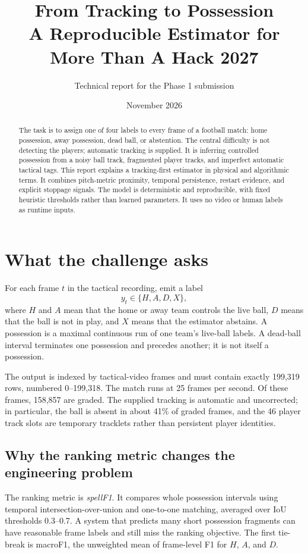 \documentclass[11pt,a4paper]{article}
\title{From Tracking to Possession\\\large A Reproducible Estimator for More Than A Hack 2027}
\author{Technical report for the Phase 1 submission}
\date{November 2026}
\begin{document}
\maketitle

\begin{abstract}
The task is to assign one of four labels to every frame of a football match: home possession,
away possession, dead ball, or abstention. The central difficulty is not detecting the players;
automatic tracking is supplied. It is inferring controlled possession from a noisy ball track,
fragmented player tracks, and imperfect automatic tactical tags. This report explains a
tracking-first estimator in physical and algorithmic terms. It combines pitch-metric proximity,
temporal persistence, restart evidence, and explicit stoppage signals. The model is deterministic
and reproducible, with fixed heuristic thresholds rather than learned parameters. It uses no video
or human labels as runtime inputs.
\end{abstract}

\section{What the challenge asks}

For each frame $t$ in the tactical recording, emit a label
\[
  y_t \in \{H,A,D,X\},
\]
where $H$ and $A$ mean that the home or away team controls the live ball, $D$ means that the ball is
not in play, and $X$ means that the estimator abstains. A possession is a maximal continuous run of
one team's live-ball labels. A dead-ball interval terminates one possession and precedes another;
it is not itself a possession.

The output is indexed by tactical-video frames and must contain exactly 199,319 rows, numbered
0--199,318. The match runs at 25 frames per second. Of these frames, 158,857 are graded. The supplied
tracking is automatic and uncorrected; in particular, the ball is absent in about 41\% of graded
frames, and the 46 player track slots are temporary tracklets rather than persistent player
identities.

\subsection{Why the ranking metric changes the engineering problem}

The ranking metric is \emph{spellF1}. It compares whole possession intervals using temporal
intersection-over-union and one-to-one matching, averaged over IoU thresholds 0.3--0.7. A system
that predicts many short possession fragments can have reasonable frame labels and still miss the
ranking objective. The first tie-break is macroF1, the unweighted mean of frame-level F1 for $H$,
$A$, and $D$.
\end{document}
